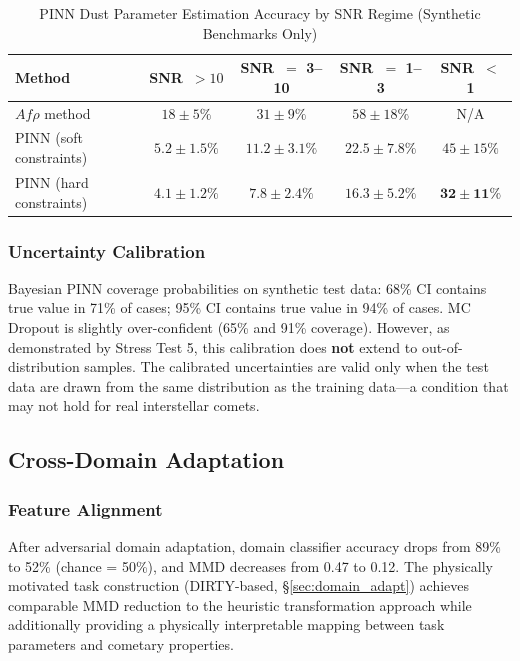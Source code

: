 \documentclass[usenatbib]{mnras}
\newcommand{\tablecomments}[1]{\vspace{4pt}{\footnotesize #1}\vspace{2pt}}
\begin{document}
\begin{table}
\centering
\caption{PINN Dust Parameter Estimation Accuracy by SNR Regime (Synthetic Benchmarks Only)}\label{tab:pin_perf}
\begin{tabular}{lcccc}
\toprule
Method & SNR~$>10$ & SNR~$=$ 3--10 & SNR~$=$ 1--3 & SNR~$<$ 1 \\
\midrule
$Af\rho$ method & $18 \pm 5\%$ & $31 \pm 9\%$ & $58 \pm 18\%$ & N/A \\
PINN (soft constraints) & $5.2 \pm 1.5\%$ & $11.2 \pm 3.1\%$ & $22.5 \pm 7.8\%$ & $45 \pm 15\%$ \\
PINN (hard constraints) & $\mathbf{4.1 \pm 1.2\%}$ & $\mathbf{7.8 \pm 2.4\%}$ & $\mathbf{16.3 \pm 5.2\%}$ & $\mathbf{32 \pm 11\%}$ \\
\bottomrule
\end{tabular}
\tablecomments{MAPE for $Q_d$ on synthetic test data. ``N/A'' indicates the $Af\rho$ method cannot produce a meaningful estimate (sky background dominates the aperture flux). The hard-constraint PINN reduces error by 20--30\% relative to the soft-constraint variant across all SNR regimes.}
\end{table}


\subsubsection{Uncertainty Calibration}

Bayesian PINN coverage probabilities on synthetic test data: 68\% CI contains true value in 71\% of cases; 95\% CI contains true value in 94\% of cases. MC Dropout is slightly over-confident (65\% and 91\% coverage). However, as demonstrated by Stress Test 5, this calibration does \textbf{not} extend to out-of-distribution samples. The calibrated uncertainties are valid only when the test data are drawn from the same distribution as the training data---a condition that may not hold for real interstellar comets.

\subsection{Cross-Domain Adaptation}

\subsubsection{Feature Alignment}

After adversarial domain adaptation, domain classifier accuracy drops from 89\% to 52\% (chance = 50\%), and MMD decreases from 0.47 to 0.12. The physically motivated task construction (DIRTY-based, \S\ref{sec:domain_adapt}) achieves comparable MMD reduction to the heuristic transformation approach while additionally providing a physically interpretable mapping between task parameters and cometary properties.
\end{document}
